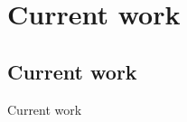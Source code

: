\chapter{Current work}
\label{Current work}
  \singlespace
  \onehalfspace
  \acresetall

\section{Current work}
\label{sec:Current work}
Current work
